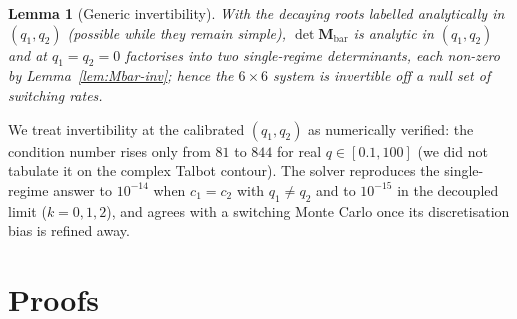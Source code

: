 \documentclass[11pt]{article}
\theoremstyle{plain}
\newtheorem{lemma}[theorem]{Lemma}
\theoremstyle{definition}
\theoremstyle{remark}
\begin{document}
\begin{lemma}[Generic invertibility]\label{lem:regime-invertible}
With the decaying roots labelled analytically in $(q_1,q_2)$ (possible while they remain simple),
$\det\mathbf M_{\mathrm{bar}}$ is analytic in $(q_1,q_2)$ and at $q_1=q_2=0$ factorises into two
single-regime determinants, each non-zero by Lemma~\ref{lem:Mbar-inv}; hence the $6\times6$ system
is invertible off a null set of switching rates.
\end{lemma}

\noindent
We treat invertibility at the calibrated $(q_1,q_2)$ as numerically verified: the condition number
rises only from $81$ to $844$ for real $q\in[0.1,100]$ (we did not tabulate it on the complex
Talbot contour). The solver reproduces the single-regime answer to
$10^{-14}$ when $c_1=c_2$ with $q_1\neq q_2$ and to $10^{-15}$ in the decoupled limit ($k=0,1,2$),
and agrees with a switching Monte Carlo once its discretisation bias is refined away.

\section{Proofs}\label{app:proofs}
\end{document}
